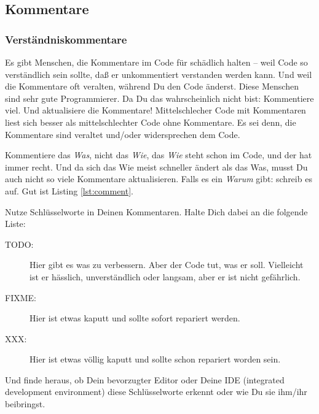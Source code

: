 \documentclass[twoside]{scrartcl}
\begin{document}
\subsection{Kommentare}
\subsubsection{Verst\"a{}ndniskommentare\label{sec:compcom}}
Es gibt Menschen, die Kommentare im Code f\"u{}r sch\"a{}dlich halten -- weil 
Code so verst\"a{}ndlich sein sollte, da\ss{} er unkommentiert verstanden
werden kann.
Und weil die Kommentare oft veralten, w\"a{}hrend Du den Code \"a{}nderst.
Diese Menschen sind sehr gute Programmierer.
Da Du das wahrscheinlich nicht bist:
Kommentiere viel. Und aktualisiere die Kommentare! 
Mittelschlecher Code mit Kommentaren liest sich besser als mittelschlechter  
Code ohne Kommentare. Es sei denn, die Kommentare sind veraltet und/oder 
widersprechen dem Code.

Kommentiere das \emph{Was}, nicht das \emph{Wie}, das \emph{Wie} steht schon im 
Code, und der hat immer recht.
Und da sich das Wie meist schneller \"a{}ndert als das Was, musst Du auch
nicht so viele Kommentare aktualisieren.
Falls es ein \emph{Warum} gibt: schreib es auf. 
Gut ist  Listing \ref{lst:comment}.



Nutze Schl\"u{}sselworte in Deinen Kommentaren. Halte Dich dabei an die folgende
Liste:
\begin{description}
\item[TODO:] Hier gibt es was zu verbessern. Aber der Code tut, was er soll.
  Vielleicht ist er h\"a{}sslich, unverst\"a{}ndlich oder langsam,
  aber er ist nicht gef\"a{}hrlich.
\item[FIXME:] Hier ist etwas kaputt und sollte sofort repariert werden.
\item[XXX:] Hier ist etwas v\"o{}llig kaputt und sollte schon repariert
  worden sein.
\end{description}
Und finde heraus, ob Dein bevorzugter Editor oder Deine IDE (integrated
development environment) diese Schl\"u{}sselworte erkennt oder wie Du sie
ihm/ihr beibringst.
\end{document}
